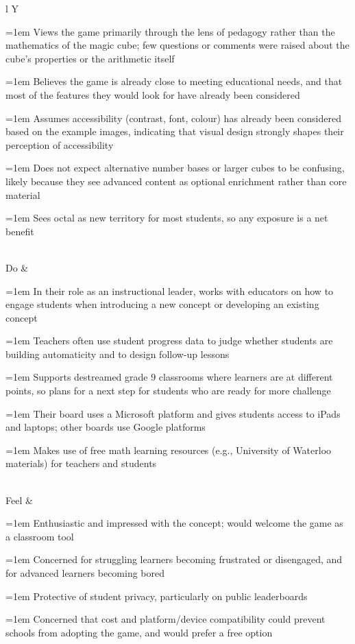 \documentclass{article}
\newcommand{\cellbullet}{\par\noindent\hangindent=1em\hangafter=1%
  \makebox[1em][l]{\textbullet}\ignorespaces}
\newenvironment{empathylist}
  {\begin{minipage}[t]{\linewidth}\let\item\cellbullet}
  {\strut\end{minipage}}
\begin{document}
\begin{tabularx}{\textwidth}{l Y}
\begin{empathylist}
  \item Views the game primarily through the lens of pedagogy rather than the mathematics of the magic cube; few questions or comments were raised about the cube's properties or the arithmetic itself
  \item Believes the game is already close to meeting educational needs, and that most of the features they would look for have already been considered
  \item Assumes accessibility (contrast, font, colour) has already been considered based on the example images, indicating that visual design strongly shapes their perception of accessibility
  \item Does not expect alternative number bases or larger cubes to be confusing, likely because they see advanced content as optional enrichment rather than core material
  \item Sees octal as new territory for most students, so any exposure is a net benefit
\end{empathylist} \\
\midrule
Do &
\begin{empathylist}
  \item In their role as an instructional leader, works with educators on how to engage students when introducing a new concept or developing an existing concept
  \item Teachers often use student progress data to judge whether students are building automaticity and to design follow-up lessons
  \item Supports destreamed grade 9 classrooms where learners are at different points, so plans for a next step for students who are ready for more challenge
  \item Their board uses a Microsoft platform and gives students access to iPads and laptops; other boards use Google platforms
  \item Makes use of free math learning resources (e.g., University of Waterloo materials) for teachers and students
\end{empathylist}\\
\midrule
Feel &
\begin{empathylist}
  \item Enthusiastic and impressed with the concept; would welcome the game as a classroom tool
  \item Concerned for struggling learners becoming frustrated or disengaged, and for advanced learners becoming bored
  \item Protective of student privacy, particularly on public leaderboards
  \item Concerned that cost and platform/device compatibility could prevent schools from adopting the game, and would prefer a free option
\end{empathylist} \\
\end{tabularx}
\end{document}

